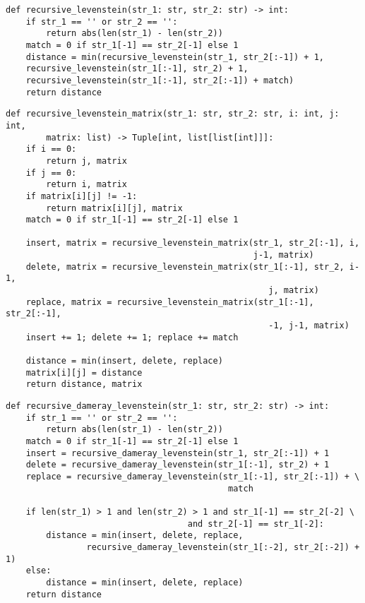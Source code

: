 \begin{lstlisting}[label=some-code,caption=Программный код нахождения расстояния Левенштейна рекурсивно без использования кэша]
def recursive_levenstein(str_1: str, str_2: str) -> int:
	if str_1 == '' or str_2 == '':
		return abs(len(str_1) - len(str_2))
	match = 0 if str_1[-1] == str_2[-1] else 1
	distance = min(recursive_levenstein(str_1, str_2[:-1]) + 1,
	recursive_levenstein(str_1[:-1], str_2) + 1,
	recursive_levenstein(str_1[:-1], str_2[:-1]) + match)
	return distance
\end{lstlisting}

\begin{lstlisting}[label=some-code,caption=Программный код нахождения расстояния Левенштейна рекурсивно с использованием матрицы]
	def recursive_levenstein_matrix(str_1: str, str_2: str, i: int, j: int,
		matrix: list) -> Tuple[int, list[list[int]]]:
	if i == 0:
		return j, matrix
	if j == 0:
		return i, matrix
	if matrix[i][j] != -1:
		return matrix[i][j], matrix
	match = 0 if str_1[-1] == str_2[-1] else 1
	
	insert, matrix = recursive_levenstein_matrix(str_1, str_2[:-1], i,
												 j-1, matrix)
	delete, matrix = recursive_levenstein_matrix(str_1[:-1], str_2, i-1,
											    	j, matrix)
	replace, matrix = recursive_levenstein_matrix(str_1[:-1], str_2[:-1],
													-1, j-1, matrix)
	insert += 1; delete += 1; replace += match
	
	distance = min(insert, delete, replace)
	matrix[i][j] = distance
	return distance, matrix
\end{lstlisting}

\begin{lstlisting}[label=some-code,caption=Программный код нахождения расстояния Дамерау-Левенштейна рекурсивно]
def recursive_dameray_levenstein(str_1: str, str_2: str) -> int:
	if str_1 == '' or str_2 == '':
		return abs(len(str_1) - len(str_2))
	match = 0 if str_1[-1] == str_2[-1] else 1
	insert = recursive_dameray_levenstein(str_1, str_2[:-1]) + 1
	delete = recursive_dameray_levenstein(str_1[:-1], str_2) + 1
	replace = recursive_dameray_levenstein(str_1[:-1], str_2[:-1]) + \
											match
	
	if len(str_1) > 1 and len(str_2) > 1 and str_1[-1] == str_2[-2] \
									and str_2[-1] == str_1[-2]:
		distance = min(insert, delete, replace,
				recursive_dameray_levenstein(str_1[:-2], str_2[:-2]) + 1)
	else:
		distance = min(insert, delete, replace)
	return distance
\end{lstlisting}

